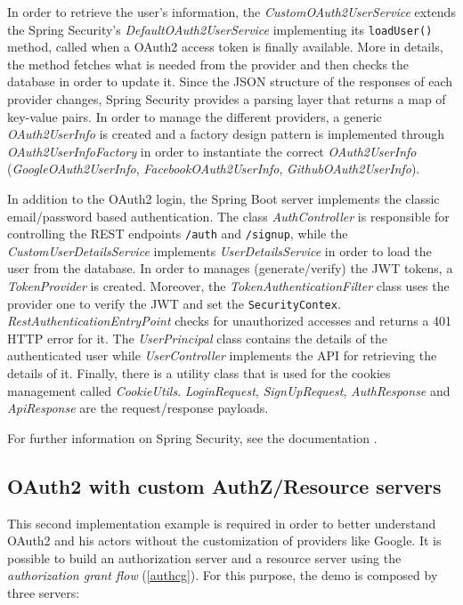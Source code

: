 In order to retrieve the user's information, the \textit{CustomOAuth2UserService} extends the Spring Security's \textit{DefaultOAuth2UserService} implementing its \texttt{loadUser()} method, called when a OAuth2 access token is finally available. More in details, the method fetches what is needed from the provider and then checks the database in order to update it. Since the JSON structure of the responses of each provider changes, Spring Security provides a parsing layer that returns a map of key-value pairs. In order to manage the different providers, a generic \textit{OAuth2UserInfo} is created and a factory design pattern is implemented through \textit{OAuth2UserInfoFactory} in order to instantiate the correct \textit{OAuth2UserInfo} (\textit{GoogleOAuth2UserInfo}, \textit{FacebookOAuth2UserInfo}, \textit{GithubOAuth2UserInfo}).

In addition to the OAuth2 login, the Spring Boot server implements the classic email/password based authentication. The class \textit{AuthController} is responsible for controlling the REST endpoints \texttt{/auth} and \texttt{/signup}, while the \textit{CustomUserDetailsService} implements \textit{UserDetailsService} in order to load the user from the database. In order to manages (generate/verify) the JWT tokens, a \textit{TokenProvider} is created. Moreover, the \textit{TokenAuthenticationFilter} class uses the provider one to verify the JWT and set the \texttt{SecurityContex}. \textit{RestAuthenticationEntryPoint} checks for unauthorized accesses and returns a 401 HTTP error for it. The \textit{UserPrincipal} class contains the details of the authenticated user while \textit{UserController} implements the API for retrieving the details of it. Finally, there is a utility class that is used for the cookies management called \textit{CookieUtils}. \textit{LoginRequest}, \textit{SignUpRequest}, \textit{AuthResponse} and \textit{ApiResponse} are the request/response payloads.

For further information on Spring Security, see the documentation \cite{sprsec}.

\subsection{OAuth2 with custom AuthZ/Resource servers}
This second implementation example is required in order to better understand OAuth2 and his actors without the customization of providers like Google. It is possible to build an authorization server and a resource server using the \textit{authorization grant flow} (\ref{authcg}). For this purpose, the demo is composed by three servers:

